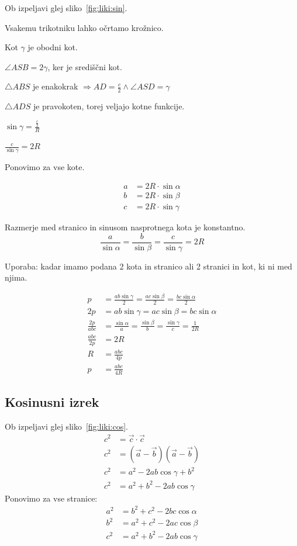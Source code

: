 \documentclass[a4paper,oneside,12pt,fleqn]{article}
\newcommand\krat\cdot
\def\kos{\cos}
\renewcommand\implies\Rightarrow
\numberwithin{equation}{section}
\newenvironment{enumerate*}%
{
\vspace{-12pt}%
\begin{enumerate}%
\setlength{\itemsep}{0pt}%
\setlength{\parskip}{2pt}}%
{\end{enumerate}}
\begin{document}
Ob izpeljavi glej sliko~\ref{fig:liki:sin}.
\begin{enumerate*}
  \item Vsakemu trikotniku lahko očrtamo krožnico.
  \item Kot $\gamma$ je obodni kot.
  \item $\angle ASB = 2\gamma$, ker je središčni kot.
  \item $\triangle ABS$ je enakokrak $\implies AD = \frac{c}{2} \land \angle ASD = \gamma$
  \item $\triangle ADS$ je pravokoten, torej veljajo kotne funkcije.
  \item $\sin\gamma = \frac{\frac{c}{2}}{R}$
  \item $\frac{c}{\sin\gamma} = 2R$
  \item Ponovimo za vse kote.
\end{enumerate*}
\begin{align*}
  a &= 2R \krat\sin\alpha \\
  b &= 2R \krat\sin\beta  \\
  c &= 2R \krat\sin\gamma
\end{align*}

Razmerje med stranico in sinusom nasprotnega kota je konstantno.
\[ \frac{a}{\sin\alpha} = \frac{b}{\sin\beta} = \frac{c}{\sin\gamma} = 2R \]

Uporaba: kadar imamo podana 2 kota in stranico ali 2 stranici in kot, ki ni med njima.

\begin{align*}
  p &= \frac{ab\sin\gamma}{2} = \frac{ac\sin\beta}{2} = \frac{bc\sin\alpha}{2} \\
  2p &=  ab\sin\gamma = ac\sin\beta = bc\sin\alpha \\
  \frac{2p}{abc} &= \frac{\sin\alpha}{a} = \frac{\sin\beta}{b} = \frac{\sin\gamma}{c} =
  \frac{1}{2R} \\
  \frac{abc}{2p} &= 2R \\
  R &= \frac{abc}{4p} \\
  p &= \frac{abc}{4R}
\end{align*}

\subsection{Kosinusni izrek}
\label{sec:liki:cos}
Ob izpeljavi glej sliko~\ref{fig:liki:cos}.
\begin{align*}
  c^2 &= \vec{c}\krat\vec{c} \\
  c^2 &= (\vec{a} - \vec{b})(\vec{a} - \vec{b}) \\
  c^2 &= a^2 - 2ab\kos\gamma + b^2 \\
  c^2 &= a^2 + b^2 - 2ab\kos\gamma
\end{align*}
Ponovimo za vse stranice:
\begin{align}
  a^2 &= b^2 + c^2 - 2bc\kos\alpha \nonumber\\
  b^2 &= a^2 + c^2 - 2ac\kos\beta \nonumber \\
  c^2 &= a^2 + b^2 - 2ab\kos\gamma \label{eq:liki:cos}
\end{align}
\end{document}
